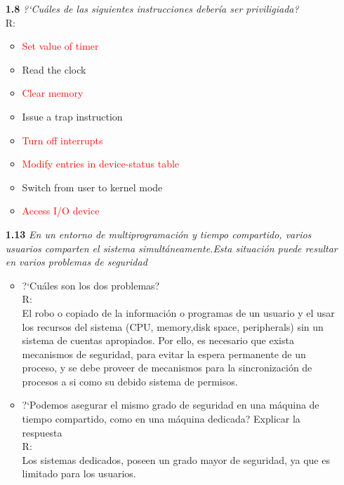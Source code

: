 \begin{itemize}
\item[\textbf{1.8}] \emph{?`Cu\'ales de las siguientes instrucciones deber\'ia
ser priviligiada?}\\
R:
	\begin{itemize}
		\item \textcolor{red}{Set value of timer}
		\item Read the clock
		\item \textcolor{red}{Clear memory}
		\item Issue a trap instruction
		\item \textcolor{red}{Turn off interrupts}
		\item \textcolor{red}{Modify entries in device-status table}
		\item Switch from user to kernel mode
		\item \textcolor{red}{Access I/O device}
	\end{itemize}

\item[\textbf{1.13}] \emph{En un entorno de multiprogramaci\'on y tiempo
compartido, varios usuarios comparten el sistema simult\'aneamente.Esta
situaci\'on puede resultar en varios problemas de seguridad}\\
	\begin{itemize}
		\item ?`Cu\'ales son los dos problemas?\\
R:\\
 El robo o copiado de la informaci\'on o programas de un usuario y el usar los recursos del sistema (CPU, memory,disk space, peripherals) sin un sistema de cuentas apropiados.
 Por ello, es necesario que exista mecanismos de seguridad, para evitar la
espera permanente de un proceso, y se debe proveer de mecanismos para la
sincronizaci\'on de procesos a si como su debido sistema de permisos. 

		\item ?`Podemos asegurar el mismo grado de seguridad en una m\'aquina de tiempo compartido, como en una m\'aquina dedicada? Explicar la respuesta\\
R:\\
 Los sistemas dedicados, poseen un grado mayor de seguridad, ya que es limitado para los usuarios.
	\end{itemize}


\end{itemize}
